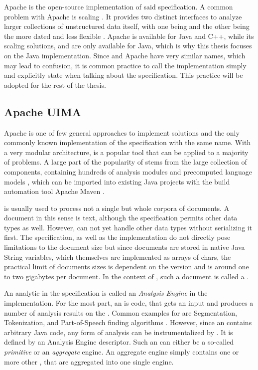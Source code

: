 Apache \uima{} is the open-source implementation of said \uima{} specification. A common problem with Apache \uima{} is scaling \cite{divita2015scaling,epstein2012making,ramakrishnan2010building}. It  provides two distinct interfaces to analyze larger collections of unstructured data itself, with one being \uimaas{} and the other being the more dated and less flexible \cpe{} \cite{OASIS:UIMA:2009}.
Apache \uima{} is available for Java and C++, while its scaling solutions, \uimacpe{} and \uimaas{} are only available for Java, which is why this thesis focuses on the Java implementation. Since \uima{} and Apache \uima{} have very similar names, which may lead to confusion, it is common practice to call the implementation simply \uima{} and explicitly state when talking about the specification. This practice will be adopted for the rest of the thesis.



\subsection{Apache UIMA}

Apache \uima{} is one of few general approaches to implement \nlp{} solutions and the only commonly known implementation of the specification with the same name. With a very modular architecture, \uima{} is a popular tool that can be applied to a majority of \nlp{} problems. A large part of the popularity of \uima{} stems from the large \dkpro{} collection of components, containing hundreds of analysis modules and precomputed language models \cite{eckartdecastilho-gurevych:2014:OIAF4HLT}, which can be imported into existing Java projects with the build automation tool Apache Maven \cite{dkpro}.

\uima{} is usually used to process not a single but whole corpora of documents. A document in this sense is text, although the \uima{} specification permits other data types as well. However, \uima{} can not yet handle other data types without serializing it first. The \uima{} specification, as well as the implementation do not directly pose limitations to the document size but since documents are stored in native Java String variables, which themselves are implemented as arrays of chars, the practical limit of documents sizes is dependent on the \jvm{} version and is around one to two gigabytes \cite{so:javastrings} per document. In the context of \uima{}, such a document is called a \sofa{}.

An analytic in the \uima{} specification is called an \emph{Analysis Engine} in the implementation. For the most part, an \anen{} is code, that gets an input \cas{} and produces a number of analysis results on the \sofa{}. Common examples for \anens{} are Segmentation, Tokenization, and Part-of-Speech finding algorithms \cite{dkpro}. However, since an \anen{} contains arbitrary Java code, any form of analysis can be instrumentalized by \uima{}. It is defined by an \xml{} Analysis Engine descriptor. Such an \anen{} can either be a so-called \emph{primitive} or an \emph{aggregate} engine. An aggregate engine simply contains one or more other \anens{}, that are aggregated into one single engine.

